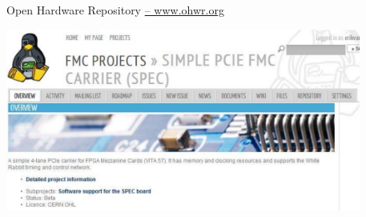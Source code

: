 \documentclass[compress,red]{beamer}
\begin{document}
\begin{frame}{Open Hardware Repository \href{http://ohwr.org}{-- www.ohwr.org}}

 \begin{center}
   \includegraphics[height=6cm]{../../figures/ohwr/ohr_spec_top.pdf}
 \end{center} 

\end{frame}
\end{document}
